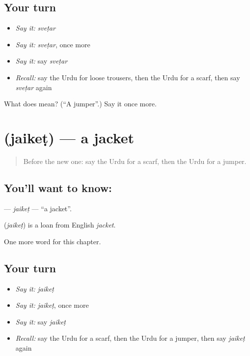 \subsection*{Your turn}
\begin{itemize}
\raggedright
  \item \emph{Say it:} \emph{sveṭar}
  \item \emph{Say it:} \emph{sveṭar}, once more
  \item \emph{Say it:} say \emph{sveṭar}
  \item \emph{Recall:} say the Urdu for loose trousers, then the Urdu for a scarf, then say \emph{sveṭar} again
\end{itemize}

\begin{tcolorbox}[breakable,colback=teal!4,colframe=teal!35!black,title={Before you move on}]
What does  mean? (\textquotedblleft{}A jumper\textquotedblright{}.) Say it once more.
\end{tcolorbox}
\section[\texorpdfstring{\ur{جیکٹ} (jaikeṭ)}{جیکٹ (jaikeṭ)}]{ (jaikeṭ) — a jacket}

\label{lesson:UR-C121-jaiket}



\begin{quote}
Before the new one: say the Urdu for a scarf, then the Urdu for a jumper.
\end{quote}

\subsection*{You'll want to know: }
\textbf{} — \emph{jaikeṭ} — \textquotedblleft{}a jacket\textquotedblright{}.

\begin{cousinweb}
\textbf{} (\emph{jaikeṭ}) is a loan from English \emph{jacket}.
\end{cousinweb}

\begin{grammarlens}[title={What you've built}]
One more word for this chapter.
\end{grammarlens}

\subsection*{Your turn}
\begin{itemize}
\raggedright
  \item \emph{Say it:} \emph{jaikeṭ}
  \item \emph{Say it:} \emph{jaikeṭ}, once more
  \item \emph{Say it:} say \emph{jaikeṭ}
  \item \emph{Recall:} say the Urdu for a scarf, then the Urdu for a jumper, then say \emph{jaikeṭ} again
\end{itemize}

